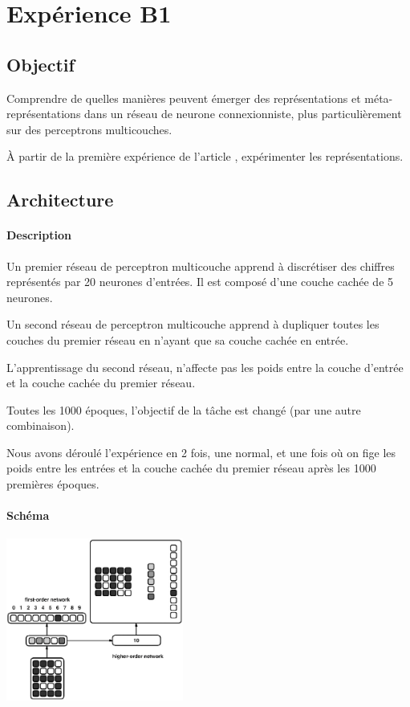 \section{Expérience B1} \label{expB1}
  \subsection{Objectif}
    Comprendre de quelles manières peuvent émerger des représentations et méta-représentations dans 
    un réseau de neurone connexionniste, plus particulièrement sur des perceptrons multicouches.
    
    
    À partir de la première expérience de l'article \cite{Cleeremans_2007}, expérimenter les représentations.
  
  \subsection{Architecture}
    \paragraph{Description}
      Un premier réseau de perceptron multicouche apprend à discrétiser des chiffres représentés
      par 20 neurones d'entrées. Il est composé d'une couche cachée de 5 neurones.
      
      Un second réseau de perceptron multicouche apprend à dupliquer toutes les couches du premier
      réseau en n'ayant que sa couche cachée en entrée.
      
      L'apprentissage du second réseau, n'affecte pas les poids entre la couche d'entrée et la 
      couche cachée du premier réseau.
      
      Toutes les 1000 époques, l'objectif de la tâche est changé (par une autre combinaison).
      
      Nous avons déroulé l'expérience en 2 fois, une normal, et une fois où on fige les poids
      entre les entrées et la couche cachée du premier réseau après les 1000 premières époques.

    \paragraph{Schéma}
      \begin{center}
	\includegraphics[width=220px]{data/expA1/schema.png}
      \end{center}
      
